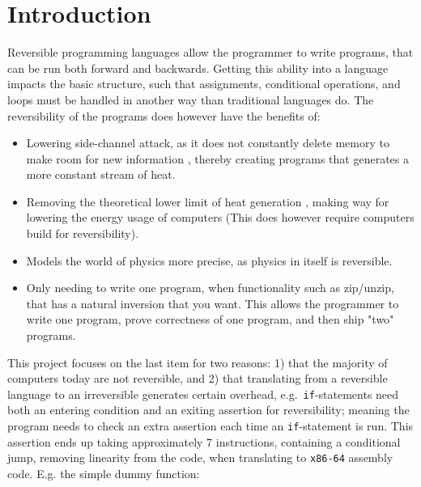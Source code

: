 
\section{Introduction }
Reversible programming languages allow the programmer to write programs, that can be run
both forward and backwards. Getting this ability into a language impacts the basic structure,
such that assignments, conditional operations, and loops must be handled in another way
than traditional languages do. The reversibility of the programs does however have the benefits
of:

\begin{itemize}
    \item Lowering side-channel attack, as it does not constantly delete memory to make room for
    new information \cite{hermes}, thereby creating programs that generates a more constant
    stream of heat.

    \item Removing the theoretical lower limit of heat generation \cite{article:3}, making way
    for lowering the energy usage of computers (This does however require computers build
    for reversibility).

    \item Models the world of physics more precise, as physics in itself is reversible.

    \item Only needing to write one program, when functionality such as zip/unzip, that has
    a natural inversion that you want. This allows the programmer to write one program, prove
    correctness of one program, and then ship "two" programs.
\end{itemize}
\noindent
This project focuses on the last item for two reasons: 1) that the majority of computers today are
not reversible, and 2) that translating from a reversible language to an irreversible
generates certain overhead, e.g.\ \texttt{if}-statements need both an entering condition and an
exiting assertion for reversibility; meaning the program needs to check an extra assertion each
time an \texttt{if}-statement is run. This assertion ends up taking approximately 7 instructions,
containing a conditional jump, removing linearity from the code, when translating to
\texttt{x86-64} assembly code. E.g. the simple dummy function:

